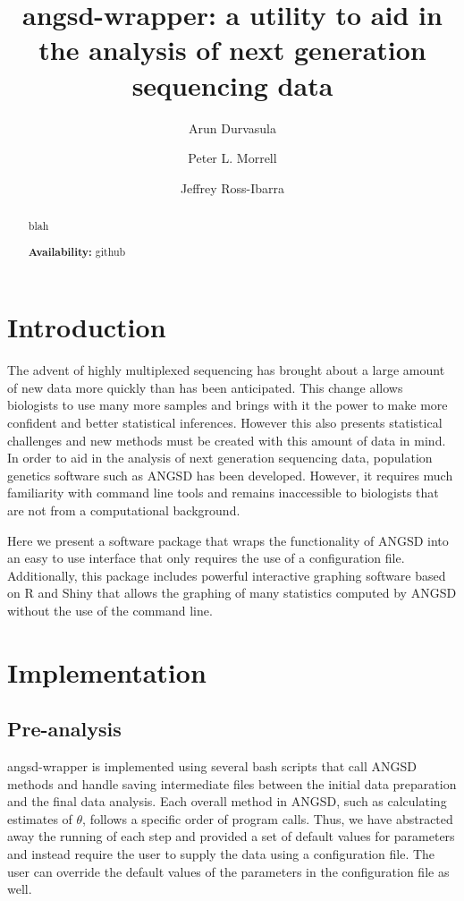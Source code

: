 \documentclass[12pt]{article}
\title{angsd-wrapper: a utility to aid in the analysis of next generation sequencing data}
\author[1]{Arun Durvasula}
\author[2]{Peter L. Morrell}
\author[1,3]{Jeffrey Ross-Ibarra}
\affil[1]{Department of Plant Sciences, University of California Davis}
\affil[2]{Department of Agronomy and Plant Genetics, University of Minnesota}
\affil[3]{Center for Population Biology and Genome Center, University of California Davis}
\date{}
\begin{document}
\maketitle

\begin{abstract}
blah

\textbf{Availability:} github
\end{abstract}

\section*{Introduction}
The advent of highly multiplexed sequencing has brought about a large amount of new data more quickly than has been anticipated. 
This change allows biologists to use many more samples and brings with it the power to make more confident and better statistical inferences.  %
However this also presents statistical challenges and new methods must be created with this amount of data in mind. 
In order to aid in the analysis of next generation sequencing data, population genetics software such as ANGSD has been developed. 
However, it requires much familiarity with command line tools and remains inaccessible to biologists that are not from a computational background. 

Here we present a software package that wraps the functionality of ANGSD into an easy to use interface that only requires the use of a configuration file. 
Additionally, this package includes powerful interactive graphing software based on R and Shiny that allows the graphing of many statistics computed by ANGSD without the use of the command line.

\section*{Implementation}

\subsection*{Pre-analysis}
angsd-wrapper is implemented using several bash scripts that call ANGSD methods and handle saving intermediate files between the initial data preparation and the final data analysis. 
Each overall method in ANGSD, such as calculating estimates of $\theta$, follows a specific order of program calls. 
Thus, we have abstracted away the running of each step and provided a set of default values for parameters and instead require the user to supply the data using a configuration file. 
The user can override the default values of the parameters in the configuration file as well. 
\end{document}
